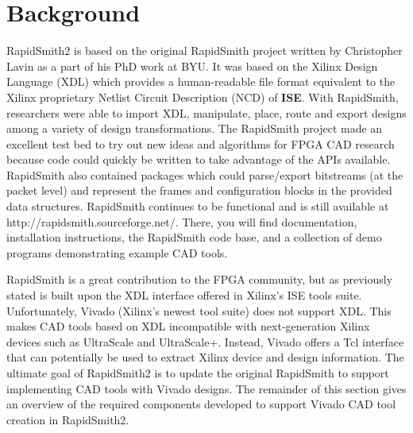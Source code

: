 \newpage
\section{Background}

\graphicspath{{./techReportFigures/sec2_background/}}

RapidSmith2 is based on the original RapidSmith project written by Christopher
Lavin as a part of his PhD work at BYU.  It was based on the Xilinx Design
Language (XDL) which provides a human-readable file format equivalent to the
Xilinx proprietary Netlist Circuit Description (NCD) of \textbf{ISE}.  With
RapidSmith, researchers were able to import XDL, manipulate, place, route and export
designs among a variety of design transformations.  The RapidSmith project made
an excellent test bed to try out new ideas and algorithms for FPGA CAD research
because code could quickly be written to take advantage of the APIs available.
RapidSmith also contained packages which could parse/export bitstreams (at the
packet level) and represent the frames and configuration blocks in the provided
data structures. RapidSmith continues to be functional and is still available at
{\color{blue} http://rapidsmith.sourceforge.net/}. There, you will find
documentation, installation instructions, the RapidSmith code base, and a
collection of demo programs demonstrating example CAD tools.

RapidSmith is a great contribution to the FPGA community, but as previously
stated is built upon the XDL interface offered in Xilinx's ISE tools suite.
Unfortunately, Vivado (Xilinx's newest tool suite) does not support XDL. This
makes CAD tools based on XDL incompatible with next-generation Xilinx devices
such as UltraScale and UltraScale+. Instead, Vivado offers a Tcl interface
that can potentially be used to extract Xilinx device and design information.
The ultimate goal of RapidSmith2 is to update the original RapidSmith to support
implementing CAD tools with Vivado designs. The remainder of this section gives
an overview of the required components developed to support Vivado CAD tool
creation in RapidSmith2.

